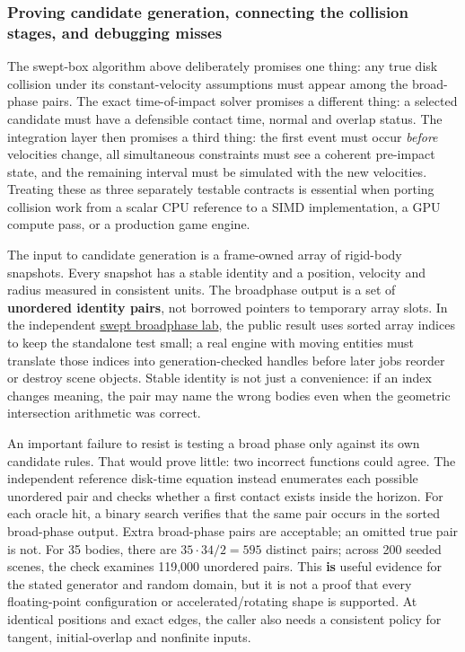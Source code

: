 \subsubsection{Proving candidate generation, connecting the collision stages, and debugging misses}\label{04-visual-computing-ii-ch026-proving-candidate-generation-connecting-the-collision-stages-and-debugging-misses}

The swept-box algorithm above deliberately promises one thing: any true disk collision under its constant-velocity assumptions must appear among the broad-phase pairs. The exact time-of-impact solver promises a different thing: a selected candidate must have a defensible contact time, normal and overlap status. The integration layer then promises a third thing: the first event must occur \emph{before} velocities change, all simultaneous constraints must see a coherent pre-impact state, and the remaining interval must be simulated with the new velocities. Treating these as three separately testable contracts is essential when porting collision work from a scalar CPU reference to a SIMD implementation, a GPU compute pass, or a production game engine.

The input to candidate generation is a frame-owned array of rigid-body snapshots. Every snapshot has a stable identity and a position, velocity and radius measured in consistent units. The broadphase output is a set of \textbf{unordered identity pairs}, not borrowed pointers to temporary array slots. In the independent \hyperref[source-file-6597829be009fc0bb1b17d87]{swept broadphase lab}, the public result uses sorted array indices to keep the standalone test small; a real engine with moving entities must translate those indices into generation-checked handles before later jobs reorder or destroy scene objects. Stable identity is not just a convenience: if an index changes meaning, the pair may name the wrong bodies even when the geometric intersection arithmetic was correct.

An important failure to resist is testing a broad phase only against its own candidate rules. That would prove little: two incorrect functions could agree. The independent reference disk-time equation instead enumerates each possible unordered pair and checks whether a first contact exists inside the horizon. For each oracle hit, a binary search verifies that the same pair occurs in the sorted broad-phase output. Extra broad-phase pairs are acceptable; an omitted true pair is not. For 35 bodies, there are \(35\cdot34/2=595\) distinct pairs; across 200 seeded scenes, the check examines 119,000 unordered pairs. This \textbf{is} useful evidence for the stated generator and random domain, but it is not a proof that every floating-point configuration or accelerated/rotating shape is supported. At identical positions and exact edges, the caller also needs a consistent policy for tangent, initial-overlap and nonfinite inputs.

